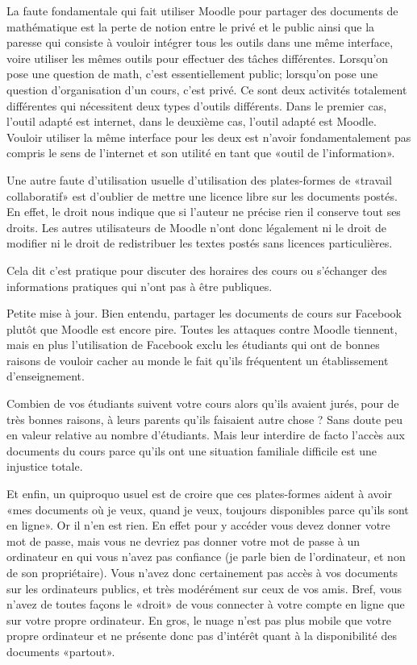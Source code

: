 La faute fondamentale qui fait utiliser Moodle pour partager des documents de mathématique est la perte de notion entre le privé et le public ainsi que la paresse qui consiste à vouloir intégrer tous les outils dans une même interface, voire utiliser les mêmes outils pour effectuer des tâches différentes. Lorsqu'on pose une question de math, c'est essentiellement public; lorsqu'on pose une question d'organisation d'un cours, c'est privé. Ce sont deux activités totalement différentes qui nécessitent deux types d'outils différents. Dans le premier cas, l'outil adapté est internet, dans le deuxième cas, l'outil adapté est Moodle. Vouloir utiliser la même interface pour les deux est n'avoir fondamentalement pas compris le sens de l'internet et son utilité en tant que «outil de l'information».

Une autre faute d'utilisation usuelle d'utilisation des plates-formes de «travail collaboratif» est d'oublier de mettre une licence libre sur les documents postés. En effet, le droit nous indique que si l'auteur ne précise rien il conserve tout ses droits. Les autres utilisateurs de Moodle n'ont donc légalement ni le droit de modifier ni le droit de redistribuer les textes postés sans licences particulières.

{\tiny Cela dit c'est pratique pour discuter des horaires des cours ou s'échanger des informations pratiques qui n'ont pas à être publiques.}

\begin{remark}
    Petite mise à jour. Bien entendu, partager les documents de cours sur Facebook plutôt que Moodle est encore pire. Toutes les attaques contre Moodle tiennent, mais en plus l'utilisation de Facebook exclu les étudiants qui ont de bonnes raisons de vouloir cacher au monde le fait qu'ils fréquentent un établissement d'enseignement.

    Combien de vos étudiants suivent votre cours alors qu'ils avaient jurés, pour de très bonnes raisons, à leurs parents qu'ils faisaient autre chose ? Sans doute peu en valeur relative au nombre d'étudiants. Mais leur interdire de facto l'accès aux documents du cours parce qu'ils ont une situation familiale difficile est une injustice totale.
\end{remark}

Et enfin, un quiproquo usuel est de croire que ces plates-formes aident à avoir «mes documents où je veux, quand je veux, toujours disponibles parce qu'ils sont en ligne». Or il n'en est rien. En effet pour y accéder vous devez donner votre mot de passe, mais vous ne devriez pas donner votre mot de passe à un ordinateur en qui vous n'avez pas confiance (je parle bien de l'ordinateur, et non de son propriétaire). Vous n'avez donc certainement pas accès à vos documents sur les ordinateurs publics, et très modérément sur ceux de vos amis. Bref, vous n'avez de toutes façons le «droit» de vous connecter à votre compte en ligne que sur votre propre ordinateur. En gros, le nuage n'est pas plus mobile que votre propre ordinateur et ne présente donc pas d'intérêt quant à la disponibilité des documents «partout».
